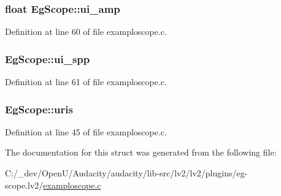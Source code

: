 \subsubsection[{\texorpdfstring{ui\+\_\+amp}{ui_amp}}]{\setlength{\rightskip}{0pt plus 5cm}float Eg\+Scope\+::ui\+\_\+amp}\hypertarget{struct_eg_scope_ae66d56d7df7c90a14fb03b20fc025df7}{}\label{struct_eg_scope_ae66d56d7df7c90a14fb03b20fc025df7}


Definition at line 60 of file examploscope.\+c.

\subsubsection[{\texorpdfstring{ui\+\_\+spp}{ui_spp}}]{ Eg\+Scope\+::ui\+\_\+spp}\hypertarget{struct_eg_scope_aeab1da6e96278a3e1210a8488260dcad}{}\label{struct_eg_scope_aeab1da6e96278a3e1210a8488260dcad}


Definition at line 61 of file examploscope.\+c.

\subsubsection[{\texorpdfstring{uris}{uris}}]{ Eg\+Scope\+::uris}\hypertarget{struct_eg_scope_a36cdd1cd4ee3b6ffa16c22f9017013cb}{}\label{struct_eg_scope_a36cdd1cd4ee3b6ffa16c22f9017013cb}


Definition at line 45 of file examploscope.\+c.



The documentation for this struct was generated from the following file\+:\begin{DoxyCompactItemize}
\item 
C\+:/\+\_\+dev/\+Open\+U/\+Audacity/audacity/lib-\/src/lv2/lv2/plugins/eg-\/scope.\+lv2/\hyperlink{examploscope_8c}{examploscope.\+c}\end{DoxyCompactItemize}
